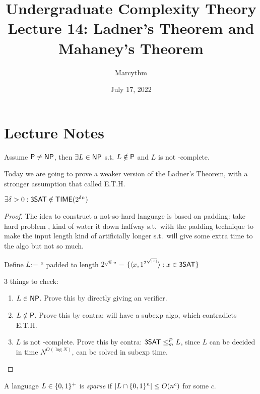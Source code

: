 \documentclass{article}
\title{Undergraduate Complexity Theory \\ Lecture 14: Ladner's Theorem and Mahaney's Theorem}
\author{Marcythm}
\date{July 17, 2022}
\begin{document}
\maketitle{}

\section{Lecture Notes}

\begin{theorem}
  Assume \(\P \neq \NP\), then \( \exists L \in \NP \) s.t. \( L \notin \P \) and \(L\) is not \NP-complete.
\end{theorem}

Today we are going to prove a weaker version of the Ladner's Theorem, with a stronger assumption that called E.T.H.

\begin{definition}
  \(\exists \delta > 0: \prob{3SAT} \notin \TIME(2^{\delta n})\)
\end{definition}

\begin{proof}
  The idea to construct a not-so-hard language is based on padding: take hard problem , kind of water it down halfway s.t.\ with the padding technique to make the input length kind of artificially longer s.t.\ will give some extra time to the algo but not so much.

  Define \(L\):= `` padded to length \(2^{\sqrt{n}}\)'' = \( \setof{\encoding{x, 1^{2^{\sqrt{|x|}}}} : x \in \prob{3SAT}} \)

  3 things to check:
  \begin{enumerate}
    \item \(L \in \NP\). Prove this by directly giving an verifier.
    \item \(L \notin \P\). Prove this by contra:  will have a subexp algo, which contradicts E.T.H.
    \item \(L\) is not \NP-complete. Prove this by contra: \(\prob{3SAT} \leq_m^P L\), since \(L\) can be decided in time \(N^{O(\log N)}\),  can be solved in subexp time.
  \end{enumerate}
\end{proof}

\begin{definition}
  A language \(L \in \setof{0, 1}^+\) is {\it sparse} if \( \abs{L \cap \setof{0, 1}^n} \leq O(n^c) \) for some \(c\).
\end{definition}
\end{document}
